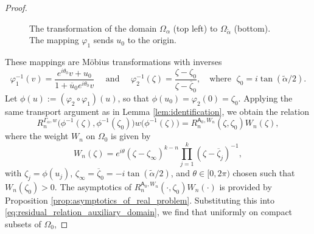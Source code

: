 \documentclass[12pt,oneside,reqno]{amsart}
\theoremstyle{definition}
\numberwithin{equation}{section}
\newcommand{\sfA}{\mathsf{A}}
\begin{document}
\begin{proof}
\begin{figure}[h]
\begin{center}
\end{center}

\caption{The transformation of the domain $\Omega_\alpha$ (top left) to $\Omega_{\tilde{\alpha}}$ (bottom). The mapping $\varphi_1$ sends $u_0$ to the origin.}
\label{fig:conformal_maps_1}
\end{figure}
These mappings are Möbius transformations with inverses
\begin{equation}
    \varphi_1^{-1}(v) = \frac{e^{i \theta_0}v + u_0}{1 + \overline{u}_0 e^{i \theta_0} v} \quad \mbox { and } \quad
    \varphi_2^{-1}(\zeta) = \frac{\zeta - \zeta_0}{\zeta - \overline{\zeta}_0}, \quad \text{where } \; \zeta_0 = i \tan(\tilde{\alpha}/{2}).
\end{equation}
Let $\phi(u) := (\varphi_2 \circ \varphi_1)(u)$, so that $\phi(u_0) = \varphi_2(0) = \zeta_0$. Applying the same transport argument as in Lemma \ref{lem:identification}, we obtain the relation
\begin{equation}
    R_n^{\Gamma_\alpha,w}\bigl(\phi^{-1}(\zeta), \phi^{-1}(\zeta_0)\bigr) w\bigl(\phi^{-1}(\zeta)\bigr) = R_n^{\sfA_0,W_n}(\zeta, \zeta_0) W_n(\zeta),
    \label{eq:residual_relation_auxiliary_domain}
\end{equation}
where the weight $W_n$ on $\Omega_0$ is given by
\begin{equation}
    W_n(\zeta) = e^{i \theta} (\zeta - \zeta_\infty)^{k - n} \prod_{j=1}^k (\zeta - \overline{\zeta}_j)^{-1},
    \label{eq:transferred_weight_2}
\end{equation}
with $\zeta_j = \phi(u_j)$, $\zeta_\infty = \overline{\zeta}_0 = -i \tan(\tilde{\alpha}/{2})$, and $\theta\in[0, 2\pi)$ chosen such that $W_n(\zeta_0) > 0$.
The asymptotics of $R_n^{\sfA_0, W_n}(\cdot, \zeta_0) W_n(\cdot)$ is provided by Proposition \ref{prop:asymptotics_of_real_problem}. Substituting this into \eqref{eq:residual_relation_auxiliary_domain}, we find that uniformly on compact subsets of $\Omega_0$,

\end{proof}
\end{document}
